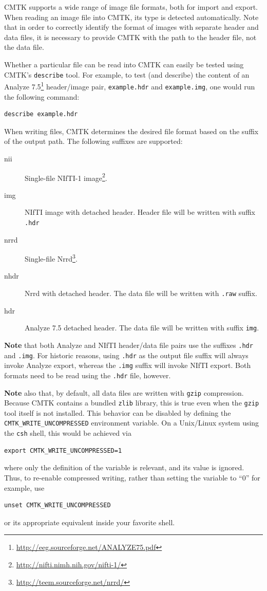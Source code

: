 \documentclass{InsightArticle}
\begin{document}
CMTK supports a wide range of image file formats, both for import and
export. When reading an image file into CMTK, its type is detected
automatically. Note that in order to correctly identify the format of images
with separate header and data files, it is necessary to provide CMTK with the
path to the header file, not the data file.

Whether a particular file can be read into CMTK can easily be tested using
CMTK's \verb|describe| tool. For example, to test (and describe) the content
of an Analyze 7.5\footnote{\url{http://eeg.sourceforge.net/ANALYZE75.pdf}}
header/image pair, \verb|example.hdr| and \verb|example.img|, one would run
the following command:
\begin{verbatim}
describe example.hdr
\end{verbatim}

When writing files, CMTK determines the desired file format based on the
suffix of the output path. The following suffixes are supported:
\begin{description}
\item [nii] Single-file NIfTI-1 image\footnote{\url{http://nifti.nimh.nih.gov/nifti-1/}}.
\item [img] NIfTI image with detached header. Header file will be written with
  suffix \verb|.hdr|
\item [nrrd] Single-file Nrrd\footnote{\url{http://teem.sourceforge.net/nrrd/}}.
\item [nhdr] Nrrd with detached header. The data file will be written with
  \verb|.raw| suffix.
\item [hdr] Analyze 7.5 detached header. The data file will be written with
  suffix \verb|img|.
\end{description}

{\bf Note} that both Analyze and NIfTI header/data file pairs use the suffixes
\verb|.hdr| and \verb|.img|. For historic reasons, using \verb|.hdr| as the
output file suffix will always invoke Analyze export, whereas the \verb|.img|
suffix will invoke NIfTI export. Both formats need to be read using the
\verb|.hdr| file, however.

{\bf Note} also that, by default, all data files are written with \verb|gzip|
compression. Because CMTK contains a bundled \verb|zlib| library, this is true
even when the \verb|gzip| tool itself is not installed. This behavior can be
disabled by defining the \verb|CMTK_WRITE_UNCOMPRESSED| environment
variable. On a Unix/Linux system using the \verb|csh| shell, this would be
achieved via
\begin{verbatim}
export CMTK_WRITE_UNCOMPRESSED=1
\end{verbatim}
where only the definition of the variable is relevant, and its value is
ignored. Thus, to re-enable compressed writing, rather than setting the
variable to ``0'' for example, use
\begin{verbatim}
unset CMTK_WRITE_UNCOMPRESSED
\end{verbatim}
or its appropriate equivalent inside your favorite shell.
\end{document}
